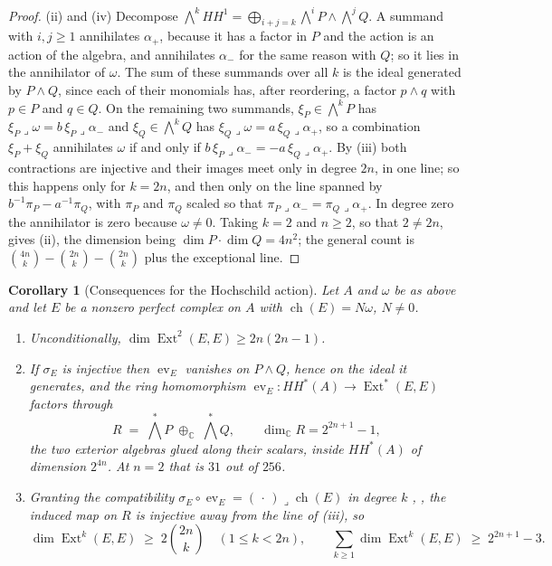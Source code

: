 \documentclass[11pt,reqno]{amsart}
\theoremstyle{plain}
\newtheorem{corollary}[theorem]{Corollary}
\theoremstyle{definition}
\theoremstyle{remark}
\newcommand{\CC}{\mathbb{C}}
\DeclareMathOperator{\ch}{ch}
\DeclareMathOperator{\Ext}{Ext}
\begin{document}
\begin{proof}
(ii) and (iv) Decompose $\bigwedge^{k}HH^{1}=\bigoplus_{i+j=k}\bigwedge^{i}P
\wedge\bigwedge^{j}Q$. A summand with $i,j\ge1$ annihilates $\alpha_{+}$,
because it has a factor in $P$ and the action is an action of the algebra, and
annihilates $\alpha_{-}$ for the same reason with $Q$; so it lies in the
annihilator of $\omega$. The sum of these summands over all $k$ is the ideal
generated by $P\wedge Q$, since each of their monomials has, after
reordering, a factor $p\wedge q$ with $p\in P$ and $q\in Q$. On the remaining
two summands, $\xi_{P}\in\bigwedge^{k}P$ has
$\xi_{P}\lrcorner\omega=b\,\xi_{P}\lrcorner\alpha_{-}$ and
$\xi_{Q}\in\bigwedge^{k}Q$ has $\xi_{Q}\lrcorner\omega=a\,\xi_{Q}\lrcorner\alpha_{+}$,
so a combination $\xi_{P}+\xi_{Q}$ annihilates $\omega$ if and only if
$b\,\xi_{P}\lrcorner\alpha_{-}=-a\,\xi_{Q}\lrcorner\alpha_{+}$. By (iii) both
contractions are injective and their images meet only in degree $2n$, in one
line; so this happens only for $k=2n$, and then only on the line spanned by
$b^{-1}\pi_{P}-a^{-1}\pi_{Q}$, with $\pi_{P}$ and $\pi_{Q}$ scaled so that
$\pi_{P}\lrcorner\alpha_{-}=\pi_{Q}\lrcorner\alpha_{+}$. In degree zero the
annihilator is zero because $\omega\ne0$. Taking $k=2$ and $n\ge2$, so that
$2\ne2n$, gives (ii), the dimension being
$\dim P\cdot\dim Q=4n^{2}$; the general count is
$\binom{4n}{k}-\binom{2n}{k}-\binom{2n}{k}$ plus the exceptional line.
\end{proof}

\begin{corollary}[Consequences for the Hochschild action]
\label{cor:hhfactor}
Let $A$ and $\omega$ be as above and let $E$ be a nonzero perfect complex on
$A$ with $\ch(E)=N\omega$, $N\ne0$.
\begin{enumerate}[label=\textup{(\roman*)},leftmargin=2.6em,itemsep=2pt]
\item Unconditionally, $\dim\Ext^{2}(E,E)\ge2n(2n-1)$.
\item If $\sigma_{E}$ is injective then $\operatorname{ev}_{E}$ vanishes on
  $P\wedge Q$, hence on the ideal it generates, and the ring homomorphism
  $\operatorname{ev}_{E}\colon HH^{*}(A)\to\Ext^{*}(E,E)$ factors through
  \[
    R\;=\;\textstyle\bigwedge^{*}P\;\oplus_{\CC}\;\bigwedge^{*}Q,
    \qquad \dim_{\CC}R=2^{2n+1}-1,
  \]
  the two exterior algebras glued along their scalars, inside $HH^{*}(A)$ of
  dimension $2^{4n}$. At $n=2$ that is $31$ out of $256$.
\item Granting the compatibility
  $\sigma_{E}\circ\operatorname{ev}_{E}=(\,\cdot\,)\lrcorner\ch(E)$ in degree
  $k$ \cite{Cal05}, \cite{CRV12}, the induced map on $R$ is injective away
  from the line of (iii), so
  \[
    \dim\Ext^{k}(E,E)\;\ge\;2\binom{2n}{k}\quad(1\le k<2n),
    \qquad
    \sum_{k\ge1}\dim\Ext^{k}(E,E)\;\ge\;2^{2n+1}-3 .
  \]
\end{enumerate}
\end{corollary}
\end{document}
